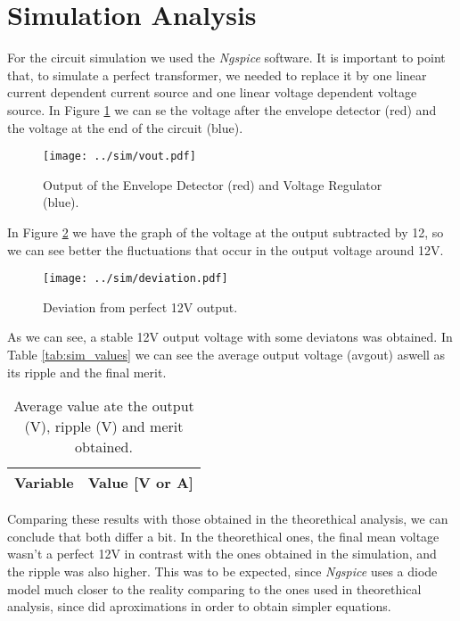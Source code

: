 \newpage

\section{Simulation Analysis}
\label{sec:simulation}

For the circuit simulation we used the \textit{Ngspice} software. It is important to point that, to simulate a perfect transformer, we needed to replace it by one linear current dependent current source and one linear voltage dependent voltage source. In Figure \ref{fig:sim_output} we can se the voltage after the envelope detector (red) and the voltage at the end of the circuit (blue).

\begin{figure}[H] \centering
\texttt{[image: ../sim/vout.pdf]}
\caption{Output of the Envelope Detector (red) and Voltage Regulator (blue).}
\label{fig:sim_output}
\end{figure}

In Figure \ref{fig:sim_deviation} we have the graph of the voltage at the output subtracted by 12, so we can see better the fluctuations that occur in the output voltage around 12V.

\begin{figure}[H] \centering
\texttt{[image: ../sim/deviation.pdf]}
\caption{Deviation from perfect 12V output.}
\label{fig:sim_deviation}
\end{figure}

As we can see, a stable 12V output voltage with some deviatons was obtained. In Table \ref{tab:sim_values} we can see the average output voltage (avgout) aswell as its ripple and the final merit.

\begin{table}[H]
  \centering
  \begin{tabular}{|l|r|}
    \hline    
    {\bf Variable} & {\bf Value [V or A]} \\ \hline
    
  \end{tabular}
  \caption{Average value ate the output (V), ripple (V) and merit obtained.}
  \label{tab:sim1}
\end{table}

Comparing these results with those obtained in the theorethical analysis, we can conclude that both differ a bit. In the theorethical ones, the final mean voltage wasn't a perfect 12V in contrast with the ones obtained in the simulation, and the ripple was also higher. This was to be expected, since \textit{Ngspice} uses a diode model much closer to the reality comparing to the ones used in theorethical analysis, since did aproximations in order to obtain simpler equations.






